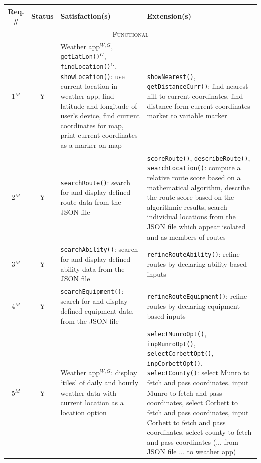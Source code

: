 \documentclass[11pt, english]{article}
\begin{document}
	\begin{center}
		\scriptsize
	\begin{longtable}{ccp{5.5cm}p{5.5cm}}
		Req. \# & Status & Satisfaction(s) & Extension(s)\\
		\hline
		\multicolumn{4}{c}{\textsc{Functional}}\\
		\hline
		1$^M$ & Y & Weather app$^{W,G}$, \texttt{getLatLon()}$^G$, \texttt{findLocation()}$^G$, \texttt{showLocation()}: use current location in weather app, find latitude and longitude of user's device, find current coordinates for map, print current coordinates as a marker on map & \texttt{showNearest()}, \texttt{getDistanceCurr()}: find nearest hill to current coordinates, find distance form current coordinates marker to variable marker\\
		2$^M$ & Y & \texttt{searchRoute()}: search for and display defined route data from the JSON file & \texttt{scoreRoute()}, \texttt{describeRoute()}, \texttt{searchLocation()}: compute a relative route score based on a mathematical algorithm, describe the route score based on the algorithmic results, search individual locations from the JSON file which appear isolated and as members of routes\\
		3$^M$ & Y & \texttt{searchAbility()}: search for and display defined ability data from the JSON file & \texttt{refineRouteAbility()}: refine routes by declaring ability-based inputs\\
		4$^M$ & Y & \texttt{searchEquipment()}: search for and display defined equipment data from the JSON file & \texttt{refineRouteEquipment()}: refine routes by declaring equipment-based inputs\\
		5$^M$ & Y & Weather app$^{W,G}$: display `tiles' of daily and hourly weather data with current location as a location option & \texttt{selectMunroOpt()}, \texttt{inpMunroOpt()}, \texttt{selectCorbettOpt()}, \texttt{inpCorbettOpt()}, \texttt{selectCounty()}: select Munro to fetch and pass coordinates, input Munro to fetch and pass coordinates, select Corbett to fetch and pass coordinates, input Corbett to fetch and pass coordinates, select county to fetch and pass coordinates (... from JSON file ... to weather app)\\

\end{longtable}
\end{center}
\end{document}
